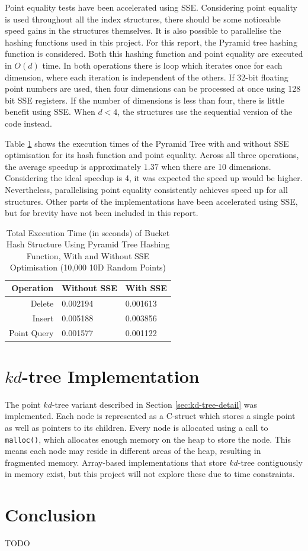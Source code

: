 Point equality tests have been accelerated using SSE. Considering point equality is used throughout all the index structures, there should be some noticeable speed gains in the structures themselves. It is also possible to parallelise the hashing functions used in this project. For this report, the Pyramid tree hashing function is considered. Both this hashing function and point equality are executed in $O(d)$ time. In both operations there is loop which iterates once for each dimension, where each iteration is independent of the others. If 32-bit floating point numbers are used, then four dimensions can be processed at once using 128 bit SSE registers. If the number of dimensions is less than four, there is little benefit using SSE. When $d<4$, the structures use the sequential version of the code instead.

Table \ref{tab:pyramid-sse} shows the execution times of the Pyramid Tree with and without SSE optimisation for its hash function and point equality. Across all three operations, the average speedup is approximately $1.37$ when there are 10 dimensions. Considering the ideal speedup is 4, it was expected the speed up would be higher. Nevertheless, parallelising point equality consistently achieves speed up for all structures. Other parts of the implementations have been accelerated using SSE, but for brevity have not been included in this report.

\begin{table}
	\centering
	\begin{tabular}{|r|l|l|}
		\hline
		\textbf{Operation} & \textbf{Without SSE} & \textbf{With SSE} \\
		\hline
		Delete & 0.002194 & 0.001613 \\
		Insert & 0.005188 & 0.003856 \\
		Point Query & 0.001577 & 0.001122 \\
		\hline
	\end{tabular}
	\caption{Total Execution Time (in seconds) of Bucket Hash Structure Using Pyramid Tree Hashing Function, With and Without SSE Optimisation (10,000 10D Random Points)}
	\label{tab:pyramid-sse}
\end{table}

\section{$kd$-tree Implementation}

The point $kd$-tree variant described in Section \ref{sec:kd-tree-detail} was implemented. Each node is represented as a C-struct which stores a single point as well as pointers to its children. Every node is allocated using a call to \texttt{malloc()}, which allocates enough memory on the heap to store the node. This means each node may reside in different areas of the heap, resulting in fragmented memory. Array-based implementations that store $kd$-tree contiguously in memory exist, but this project will not explore these due to time constraints.

\section{Conclusion}

TODO